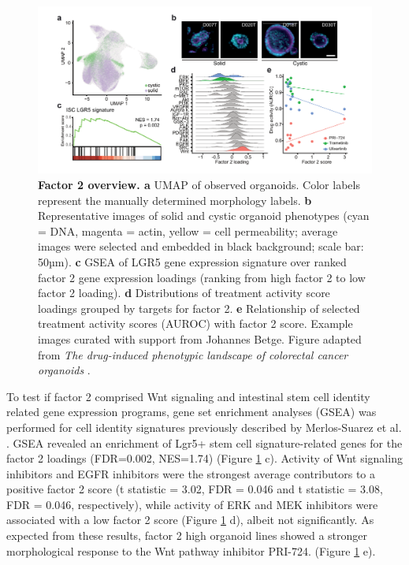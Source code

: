 \begin{flushleft}
\begin{figure}[h!]
\centering
\includegraphics[width=\textwidth,
                height=\textheight,
                keepaspectratio]{figures/promise/pdf/fig_5_1.pdf}
\caption[Factor 2 overview]{\textbf{Factor 2 overview. a} UMAP of observed organoids. Color labels represent the manually determined morphology labels. \textbf{b} Representative images of solid and cystic organoid phenotypes (cyan = DNA, magenta = actin, yellow = cell permeability; average images were selected and embedded in black background; scale bar: 50µm). \textbf{c} GSEA of LGR5 gene expression signature over ranked factor 2 gene expression loadings (ranking from high factor 2 to low factor 2 loading). \textbf{d} Distributions of treatment activity score loadings grouped by targets for factor 2. \textbf{e} Relationship of selected treatment activity scores (AUROC) with factor 2 score. Example images curated with support from Johannes Betge. Figure adapted from \textit{The drug-induced phenotypic landscape of colorectal cancer organoids} \parencite{betgeDruginducedPhenotypicLandscape2022}.}
\label{fig_251}
\end{figure}
\bigbreak

To test if factor 2 comprised Wnt signaling and intestinal stem cell identity related gene expression programs, gene set enrichment analyses (GSEA) was performed for cell identity signatures previously described by Merlos-Suarez et al. \parencite{merlos-suarezIntestinalStemCell2011}. GSEA revealed an enrichment of Lgr5+ stem cell signature-related genes for the factor 2 loadings (FDR=0.002, NES=1.74) (Figure \ref{fig_251} c). Activity of Wnt signaling inhibitors and EGFR inhibitors were the strongest average contributors to a positive factor 2 score (t statistic = 3.02, FDR = 0.046 and t statistic = 3.08, FDR = 0.046, respectively), while activity of ERK and MEK inhibitors were associated with a low factor 2 score (Figure \ref{fig_251} d), albeit not significantly. As expected from these results, factor 2 high organoid lines showed a stronger morphological response to the Wnt pathway inhibitor PRI-724. (Figure \ref{fig_251} e).


\end{flushleft}
